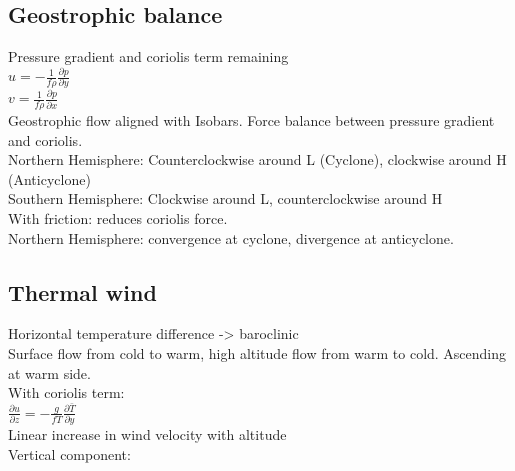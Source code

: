 \subsection*{Geostrophic balance}
Pressure gradient and coriolis term remaining\\
$u=-\frac{1}{f\rho}\frac{\partial p}{\partial y}$\\
$v=\frac{1}{f\rho}\frac{\partial p}{\partial x}$\\
Geostrophic flow aligned with Isobars. Force balance between pressure gradient and coriolis.\\
Northern Hemisphere: Counterclockwise around L (Cyclone), clockwise around H (Anticyclone)\\
Southern Hemisphere: Clockwise around L, counterclockwise around H\\
With friction: reduces coriolis force.\\
Northern Hemisphere: convergence at cyclone, divergence at anticyclone.
\subsection*{Thermal wind}
Horizontal temperature difference -> baroclinic\\
Surface flow from cold to warm, high altitude flow from warm to cold. Ascending at warm side.\\
With coriolis term:\\
$\frac{\partial u}{\partial z}=-\frac{g}{fT}\frac{\partial \bar{T}}{\partial y}$\\
Linear increase in wind velocity with altitude\\
Vertical component:
